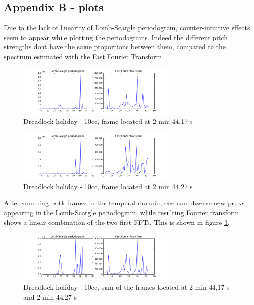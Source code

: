 \documentclass[letterpaper]{article}
\begin{document}
\subsection{Appendix B - plots}

Due to the lack of linearity of Lomb-Scargle periodogram, counter-intuitive effects seem to appear while plotting the periodograms. Indeed the different pitch strengths don\textquotesingle t have the same proportions between them, compared to the spectrum estimated with the Fast Fourier Transform.

\begin{figure}[h!]
\begin{center}
\includegraphics[width=3.1in,angle=0]{imgs/1frame.png}
\caption{Dreadlock holiday - 10cc, frame located at 2 min 44,17 s}
\label{fig:frame1}
\end{center}
\end{figure}

\begin{figure}[h!]
\begin{center}
\includegraphics[width=3.1in,angle=0]{imgs/2frame.png}
\caption{Dreadlock holiday - 10cc, frame located at 2 min 44,27 s}
\label{fig:frame2}
\end{center}
\end{figure}

After summing both frames in the temporal domain, one can observe new peaks appearing in the Lomb-Scargle periodogram, while resulting Fourier transform shows a linear combination of the two first FFTs. This is shown in figure \ref{fig:frame1and2}.

\begin{figure}[h!]
\begin{center}
\includegraphics[width=3.1in,angle=0]{imgs/2frames.png}
\caption{Dreadlock holiday - 10cc, sum of the frames located at 2 min 44,17 s and 2 min 44,27 s}
\label{fig:frame1and2}
\end{center}
\end{figure}
\end{document}
